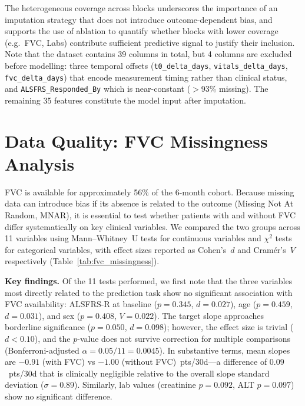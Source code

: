 The heterogeneous coverage across blocks underscores the importance of an imputation strategy that does not introduce outcome-dependent bias, and supports the use of ablation to quantify whether blocks with lower coverage (e.g.\ FVC, Labs) contribute sufficient predictive signal to justify their inclusion.
Note that the dataset contains 39 columns in total, but 4 columns are excluded before modelling: three temporal offsets (\texttt{t0\_delta\_days}, \texttt{vitals\_delta\_days}, \texttt{fvc\_delta\_days}) that encode measurement timing rather than clinical status, and \texttt{ALSFRS\_Responded\_By} which is near-constant ($>$93\% missing).
The remaining 35 features constitute the model input after imputation.


\section{Data Quality: FVC Missingness Analysis}
\label{sec:results_fvc_missingness}

FVC is available for approximately 56\% of the 6-month cohort.
Because missing data can introduce bias if its absence is related to the outcome (Missing Not At Random, MNAR), it is essential to test whether patients with and without FVC differ systematically on key clinical variables.
We compared the two groups across 11 variables using Mann--Whitney~U tests for continuous variables and $\chi^2$ tests for categorical variables, with effect sizes reported as Cohen's~$d$ and Cramér's~$V$ respectively (Table~\ref{tab:fvc_missingness}).


\break



\noindent\textbf{Key findings.}
Of the 11 tests performed, we first note that the three variables most directly related to the prediction task show no significant association with FVC availability:
ALSFRS-R at baseline ($p\!=\!0.345$, $d\!=\!0.027$), age ($p\!=\!0.459$, $d\!=\!0.031$), and sex ($p\!=\!0.408$, $V\!=\!0.022$).
The target slope approaches borderline significance ($p\!=\!0.050$, $d\!=\!0.098$); however, the effect size is trivial ($d < 0.10$), and the $p$-value does not survive correction for multiple comparisons (Bonferroni-adjusted $\alpha\!=\!0.05/11\!=\!0.0045$).
In substantive terms, mean slopes are $-0.91$ (with FVC) vs $-1.00$ (without FVC)~pts/30d---a difference of $0.09$~pts/30d that is clinically negligible relative to the overall slope standard deviation ($\sigma\!=\!0.89$).
Similarly, lab values (creatinine $p\!=\!0.092$, ALT $p\!=\!0.097$) show no significant difference.

